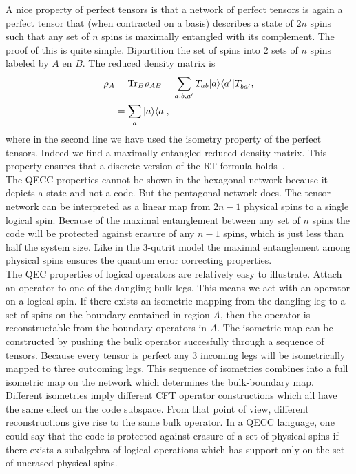 \documentclass{PoS}
\newcommand{\ket}[1]{|#1\rangle}
\newcommand{\bra}[1]{\langle#1|}
\begin{document}
A nice property of perfect tensors is that a network of perfect tensors is again a perfect tensor that (when contracted on a basis) describes a state of $2n$ spins such that any set of $n$ spins is maximally entangled with its complement. The proof of this is quite simple. Bipartition the set of spins into $2$ sets of $n$ spins labeled by $A$ en $B$. The reduced density matrix is
\begin{align}
\rho_A &= \text{Tr}_B \rho_{AB} = \sum\limits_{a,b,a'} T_{ab}\ket{a}\bra{a'} T^{\*}_{ba'},\nonumber\\
&= \sum\limits_{a} \ket{a}\bra{a},
\end{align}
where in the second line we have used the isometry property of the perfect tensors. Indeed we find a maximally entangled reduced density matrix. This property ensures that a discrete version of the RT formula holds~\cite{Pastawski:2015qua}.\\


The QECC properties cannot be shown in the hexagonal network because it depicts a state and not a code. But the pentagonal network does. The tensor network can be interpreted as a linear map from $2n-1$ physical spins to a single logical spin. Because of the maximal entanglement between any set of $n$ spins the code will be protected against erasure of any $n-1$ spins, which is just less than half the system size. Like in the $3$-qutrit model the maximal entanglement among physical spins ensures the quantum error correcting properties.\\
The QEC properties of logical operators are relatively easy to illustrate. Attach an operator to one of the dangling bulk legs. This means we act with an operator on a logical spin. If there exists an isometric mapping from the dangling leg to a set of spins on the boundary contained in region $A$, then the operator is reconstructable from the boundary operators in $A$. The isometric map can be constructed by pushing the bulk operator succesfully through a sequence of tensors. Because every tensor is perfect any $3$ incoming legs will be isometrically mapped to three outcoming legs. This sequence of isometries combines into a full isometric map on the network which determines the bulk-boundary map. Different isometries imply different CFT operator constructions which all have the same effect on the code subspace. From that point of view, different reconstructions give rise to the same bulk operator. In a QECC language, one could say that the code is protected against erasure of a set of physical spins if there exists a subalgebra of logical operations which has support only on the set of unerased physical spins.\\
\end{document}
